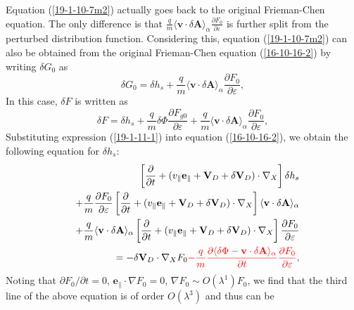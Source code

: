 \documentclass{article}
\newcommand{\tmcolor}[2]{{\color{#1}{#2}}}
\begin{document}
Equation (\ref{19-1-10-7m2}) actually goes back to the original Frieman-Chen
equation. The only difference is that $\frac{q}{m} \langle \mathbf{v} \cdot
\delta \mathbf{A} \rangle_{\alpha} \frac{\partial F_0}{\partial \varepsilon}$
is further split from the perturbed distribution function. Considering this,
equation (\ref{19-1-10-7m2}) can also be obtained from the original
Frieman-Chen equation (\ref{16-10-16-2}) by writing $\delta G_0$ as
\begin{equation}
  \label{19-1-11-1} \delta G_0 = \delta h_s + \frac{q}{m} \langle \mathbf{v}
  \cdot \delta \mathbf{A} \rangle_{\alpha} \frac{\partial F_0}{\partial
  \varepsilon},
\end{equation}
In this case, $\delta F$ is written as
\begin{equation}
  \delta F = \delta h_s + \frac{q}{m} \delta \Phi \frac{\partial F_{g
  0}}{\partial \varepsilon} + \frac{q}{m} \langle \mathbf{v} \cdot \delta
  \mathbf{A} \rangle_{\alpha} \frac{\partial F_0}{\partial \varepsilon},
\end{equation}
Substituting expression (\ref{19-1-11-1}) into equation (\ref{16-10-16-2}), we
obtain the following equation for $\delta h_s$:
\begin{eqnarray}
  &  & \left[ \frac{\partial}{\partial t} + (v_{\parallel}
  \mathbf{e}_{\parallel} +\mathbf{V}_D + \delta \mathbf{V}_D) \cdot \nabla_X
  \right] \delta h_s \nonumber\\
  &  & + \frac{q}{m} \frac{\partial F_0}{\partial \varepsilon} \left[
  \frac{\partial}{\partial t} + (v_{\parallel} \mathbf{e}_{\parallel}
  +\mathbf{V}_D + \delta \mathbf{V}_D) \cdot \nabla_X \right] \langle
  \mathbf{v} \cdot \delta \mathbf{A} \rangle_{\alpha} \nonumber\\
  &  & + \frac{q}{m} \langle \mathbf{v} \cdot \delta \mathbf{A}
  \rangle_{\alpha} \left[ \frac{\partial}{\partial t} + (v_{\parallel}
  \mathbf{e}_{\parallel} +\mathbf{V}_D + \delta \mathbf{V}_D) \cdot \nabla_X
  \right] \frac{\partial F_0}{\partial \varepsilon} \nonumber\\
  &  & = - \delta \mathbf{V}_D \cdot \nabla_X F_0 \tmcolor{red}{- \frac{q}{m}
  \frac{\partial \langle \delta \Phi -\mathbf{v} \cdot \delta \mathbf{A}
  \rangle_{\alpha}}{\partial t} \frac{\partial F_0}{\partial \varepsilon}}, 
  \label{19-1-10-e1}
\end{eqnarray}
Noting that $\partial F_0 / \partial t = 0$, $\mathbf{e}_{\parallel} \cdot
\nabla F_0 = 0$, $\nabla F_0 \sim O (\lambda^1) F_0$, we find that the third
line of the above equation is of order $O (\lambda^3)$ and thus can be
\end{document}
